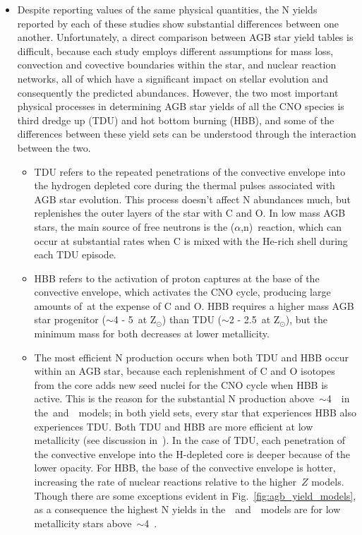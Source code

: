 \documentclass[ms.tex]{subfiles}
\begin{document}
\begin{itemize} 
	\item Despite reporting values of the same physical quantities, the N 
	yields reported by each of these studies show substantial differences 
	between one another. 
	Unfortunately, a direct comparison between AGB star yield tables is 
	difficult, because each study employs different assumptions for mass loss, 
	convection and covective boundaries within the star, and nuclear reaction 
	networks, all of which have a significant impact on stellar evolution and 
	consequently the predicted abundances. 
	However, the two most important physical processes in determining AGB star 
	yields of all the CNO species is third dredge up (TDU) and hot bottom 
	burning (HBB), and some of the differences between these yield sets can be 
	understood through the interaction between the two. 
	\begin{itemize} 
		\item TDU refers to the repeated penetrations of the convective 
		envelope into the hydrogen depleted core during the thermal pulses 
		associated with AGB star evolution. 
		This process doesn't affect N abundances much, but replenishes the 
		outer layers of the star with C and O. 
		In low mass AGB stars, the main source of free neutrons is the 
		\Cthirteen($\alpha$,n)\Osixteen~reaction, which can occur at 
		substantial rates when C is mixed with the He-rich shell during each 
		TDU episode. 

		\item HBB refers to the activation of proton captures at the base of 
		the convective envelope, which activates the CNO cycle, producing large 
		amounts of~\Nfourteen at the expense of C and O. HBB requires a higher 
		mass AGB star progenitor ($\sim$4 - 5~\msun at Z$_\odot$) than TDU 
		($\sim$2 - 2.5~\msun at Z$_\odot$), but the minimum mass for both 
		decreases at lower metallicity. 

		\item The most efficient N production occurs when both TDU and HBB 
		occur within an AGB star, because each replenishment of C and O 
		isotopes from the core adds new seed nuclei for the CNO cycle when HBB 
		is active. 
		This is the reason for the substantial N production 
		above~$\sim$4~\msun~in the~\karakasten and~\karakas~models; in both 
		yield sets, every star that experiences HBB also experiences TDU. 
		Both TDU and HBB are more efficient at low metallicity (see discussion 
		in~\ventura). 
		In the case of TDU, each penetration of the convective envelope into 
		the H-depleted core is deeper because of the lower opacity. 
		For HBB, the base of the convective envelope is hotter, increasing the 
		rate of nuclear reactions relative to the higher~$Z$ models. 
		Though there are some exceptions evident in 
		Fig.~\ref{fig:agb_yield_models}, as a consequence the highest N yields 
		in the~\karakasten~and~\karakas~models are for low metallicity stars 
		above~$\sim$4~\msun. 


\end{itemize}
\end{itemize}
\end{document}
